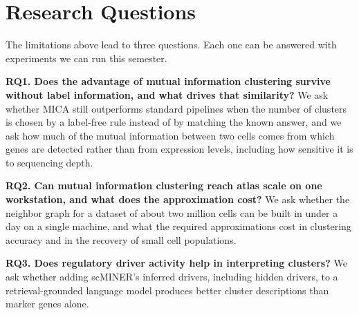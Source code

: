 \section{Research Questions}
The limitations above lead to three questions. Each one can be answered with experiments we can run this semester.

\textbf{RQ1. Does the advantage of mutual information clustering survive without label information, and what drives that similarity?} We ask whether MICA still outperforms standard pipelines when the number of clusters is chosen by a label-free rule instead of by matching the known answer, and we ask how much of the mutual information between two cells comes from which genes are detected rather than from expression levels, including how sensitive it is to sequencing depth.

\textbf{RQ2. Can mutual information clustering reach atlas scale on one workstation, and what does the approximation cost?} We ask whether the neighbor graph for a dataset of about two million cells can be built in under a day on a single machine, and what the required approximations cost in clustering accuracy and in the recovery of small cell populations.

\textbf{RQ3. Does regulatory driver activity help in interpreting clusters?} We ask whether adding scMINER's inferred drivers, including hidden drivers, to a retrieval-grounded language model produces better cluster descriptions than marker genes alone.
